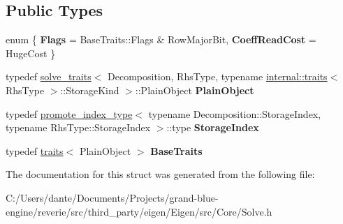 \subsection*{Public Types}
\begin{DoxyCompactItemize}
\item 
\mbox{\label{struct_eigen_1_1internal_1_1traits_3_01_solve_3_01_decomposition_00_01_rhs_type_01_4_01_4_a1c88b55bb9cb108a048dc038f2167b4e}} 
enum \{ {\bfseries Flags} = Base\+Traits\+::Flags \& Row\+Major\+Bit, 
{\bfseries Coeff\+Read\+Cost} = Huge\+Cost
 \}
\item 
\mbox{\label{struct_eigen_1_1internal_1_1traits_3_01_solve_3_01_decomposition_00_01_rhs_type_01_4_01_4_ac3e6f6f9cceda71019bfe341bdda4bcb}} 
typedef \mbox{\hyperlink{struct_eigen_1_1internal_1_1solve__traits}{solve\+\_\+traits}}$<$ Decomposition, Rhs\+Type, typename \mbox{\hyperlink{struct_eigen_1_1internal_1_1traits}{internal\+::traits}}$<$ Rhs\+Type $>$\+::Storage\+Kind $>$\+::Plain\+Object {\bfseries Plain\+Object}
\item 
\mbox{\label{struct_eigen_1_1internal_1_1traits_3_01_solve_3_01_decomposition_00_01_rhs_type_01_4_01_4_a7b5f686dd63b88493d8b841d51dc4b36}} 
typedef \mbox{\hyperlink{struct_eigen_1_1internal_1_1promote__index__type}{promote\+\_\+index\+\_\+type}}$<$ typename Decomposition\+::\+Storage\+Index, typename Rhs\+Type\+::\+Storage\+Index $>$\+::type {\bfseries Storage\+Index}
\item 
\mbox{\label{struct_eigen_1_1internal_1_1traits_3_01_solve_3_01_decomposition_00_01_rhs_type_01_4_01_4_aaf0ecbe963cd667d5fcba412bbea7f35}} 
typedef \mbox{\hyperlink{struct_eigen_1_1internal_1_1traits}{traits}}$<$ Plain\+Object $>$ {\bfseries Base\+Traits}
\end{DoxyCompactItemize}


The documentation for this struct was generated from the following file\+:\begin{DoxyCompactItemize}
\item 
C\+:/\+Users/dante/\+Documents/\+Projects/grand-\/blue-\/engine/reverie/src/third\+\_\+party/eigen/\+Eigen/src/\+Core/Solve.\+h\end{DoxyCompactItemize}
